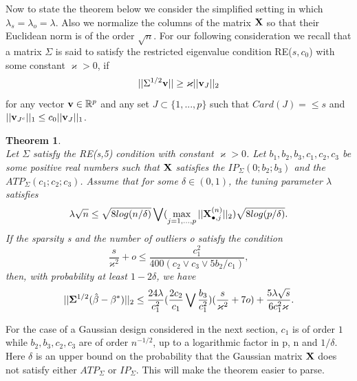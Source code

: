 \documentclass[a4paper,10pt]{article}
\newtheorem{theorem}{Theorem}
\theoremstyle{definition}
\begin{document}
Now to state the theorem below we consider the simplified setting in which $\lambda_s = \lambda_o = \lambda$. Also we normalize the columns of the matrix $\bold{X}$ so that their Euclidean norm is of the order $\sqrt{n}$.
For our following consideration we recall that a matrix $\Sigma$ is said to satisfy the restricted eigenvalue condition RE($s,c_0$) with some constant $\varkappa >0$, if
\begin{equation*}
	||\Sigma^{1/2}\bold{v}|| \geq \varkappa ||\bold{v}_J||_2
\end{equation*}
for any vector $\bold{v}\in \mathbb{R}^p$ and any set $J \subset \{1,...,p\}$ such that $Card(J) = \leq s$ and $||\bold{v}_{J^c}||_1 \leq c_0||\bold{v}_J||_1$.

\begin{theorem}\ \\
	Let $\Sigma$ satisfy the RE(s,5) condition with constant $\varkappa > 0$. Let $b_1,b_2,b_3, c_1, c_2, c_3$ be some positive real numbers such that $\bold{X}$ satisfies the $IP_{\Sigma}(0;b_2;b_3)$ and the $ATP_{\Sigma}(c_1;c_2;c_3)$. Assume that for some $\delta \in (0,1)$, the tuning parameter $\lambda$ satisfies
	\begin{equation*}
		\lambda \sqrt{n} \leq \sqrt{8 log(n/\delta)} \bigvee (\max\limits_{j = 1,...,p}||\bold{X}_{\bullet, j}^{(n)}||_2)\sqrt{8log(p/\delta)}.
	\end{equation*}
	If the sparsity s and the number of outliers o satisfy the condition
	\begin{equation*}
		\frac{s}{\varkappa^2} + o \leq \frac{c_1^2}{400(c_2 \vee c_3 \vee 5b_2/c_1)},
	\end{equation*}
	then, with probability at least $1-2\delta$, we have
	\begin{equation*}
		||\bold{\Sigma}^{1/2}(\hat{\beta}- \beta^*)||_2 \leq \frac{24\lambda}{c_1^2}(\frac{2c_2}{
			c_1} \bigvee \frac{b_3}{c_1^2}) (\frac{s}{\varkappa^2} + 7o) + \frac{5\lambda\sqrt{s}}{6c_1^2\varkappa}.
	\end{equation*}
\end{theorem}

For the case of a Gaussian design considered in the next section, $c_1$ is of order $1$ while $b_2,b_3,c_2,c_3$ are of order $n^{-1/2}$, up to a logarithmic factor in p, n and $1/\delta$. Here $\delta$ is an upper bound on the probability that the Gaussian matrix $\bold{X}$ does not satisfy either $ATP_{\Sigma}$ or $IP_{\Sigma}$. This will make the theorem easier to parse.
\end{document}
